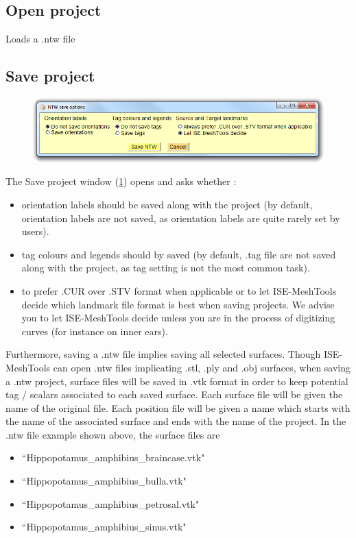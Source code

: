 \subsection{Open project}
Loads a .ntw file

\subsection{Save project}
\begin{figure}
  \centering  
 \includegraphics[scale=0.5]{images/File/Save_ntw.png}
\label{save_project_file}
\end{figure}
The Save project window (\ref{save_project_file}) opens and asks whether :  
\begin{itemize}
\item orientation labels should be saved along with the project (by default, orientation labels are not saved, as orientation labels are quite rarely set by users). 
\item tag colours and legends should by saved (by default, .tag file are not saved along with the project, as tag setting is not the most common task). 
\item to prefer .CUR over .STV format when applicable or to let ISE-MeshTools decide which landmark file format is best when saving projects. We advise you to let ISE-MeshTools decide unless you are in the process of digitizing curves (for instance on inner ears). 
\end{itemize}
Furthermore, saving a .ntw file implies saving all selected surfaces. Though ISE-MeshTools can open .ntw files implicating .stl, .ply and .obj surfaces, when saving a .ntw project, surface files will be saved in .vtk format in order to keep potential tag / scalars associated to each saved surface. Each surface file will be given the name of the original file. Each position file will be given a name which starts with the name of the associated surface and ends with the name of the project. In the .ntw file example shown above, the surface files are 
\begin{itemize}
\item ``Hippopotamus\_amphibius\_braincase.vtk" 
\item ``Hippopotamus\_amphibius\_bulla.vtk" 
\item ``Hippopotamus\_amphibius\_petrosal.vtk" 
\item ``Hippopotamus\_amphibius\_sinus.vtk" 
\end{itemize}
